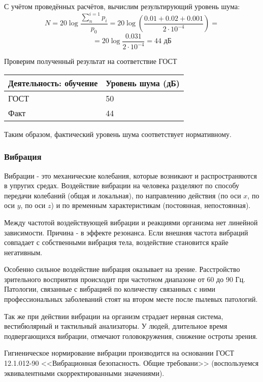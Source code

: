 С учётом проведённых расчётов, вычислим результирующий уровень шу\-ма:
$$
N = 20 \log \frac{\sum\limits_{n}^{i=1}p_i}{p_0} =  20 \log \left(\frac{0.01 + 0.02 + 0.001}{2 \cdot 10^{-4}}\right) = 
$$
$$
=  20 \log \frac{0.031}{2 \cdot 10^{-4}} = 44 \mbox{ дБ}
$$

Проверим полученный результат на соответствие ГОСТ

\begin{table}[H]
\begin{center}
\begin{tabular}{|p{4cm}|p{3cm}|}
\hline
Деятельность: обучение & Уровень шума (дБ)  \\
\hline
ГОСТ & 50  \\
\hline
Факт & 44  \\
\hline
\end{tabular}
\end{center}
\end{table}

Таким образом, фактический уровень шума соответствует нормативному.

\subsubsection{Вибрация}

Вибрации - это механические колебания, которые возникают и распро\-страняются в упругих средах. Воздействие вибрации на человека разделяют по способу передачи коле\-баний (общая и локальная), по направлению дей\-ствия (по оси $x$, по оси $y$, по оси $z$) и по временным характеристикам (по\-стоянная, непостоянная).

Между частотой воздействующей вибрации и реакциями организма нет линейной зави\-симости. Причина - в эффекте резонанса. Если внешняя частота вибраций совпадает с собственными вибрация тела, воздействие становится крайе негативным.

Особенно сильное воздействие вибрация оказывает на зрение. Расстрой\-ство зрительного восприятия происходит при частотном диапазоне от $60$ до $90$ Гц. Патологии, связанные с вибрацией по количеству связанных с ними профес\-сиональных заболеваний стоят на втором месте после пылевых патологий.

Так же при действии вибрации на организм страдает нервная система, вестибюлярный и тактильный анализаторы. У людей, длительное время под\-вергающихся вибрации, отме\-чают головокружения, снижение остроты зрения.

Гигиеническое нормирование вибрации производится на основании ГОСТ 12.1.012-90 <<Вибрационная безопасность. Общие требовани>> (воспользуемся эквивалентными скор\-ректированными значениями).

